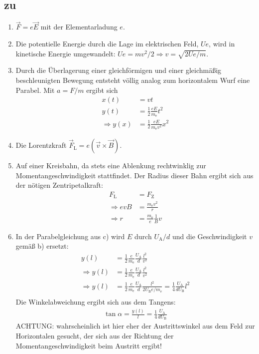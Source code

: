 \documentclass[a4paper]{scrartcl}
\begin{document}
\subsection{zu }
\label{lsg:ElektronEB}
\begin{enumerate}[noitemsep]
  \item $\vec F = e\vec E$ mit der Elementarladung $e$.
  \item Die potentielle Energie durch die Lage im elektrischen Feld, $Ue$, wird in kinetische Energie umgewandelt: $Ue = mv^2/2 \Rightarrow v = \sqrt{2Ue/m}$.
  \item Durch die Überlagerung einer gleichförmigen und einer gleichmäßig beschleunigten Bewegung entsteht völlig analog zum horizontalem Wurf eine Parabel. Mit $a = F/m$ ergibt sich
    \begin{align*}
      x(t) &= vt\\
      y(t) &= \frac{1}{2} \frac{eE}{m_\text{e}} t^2\\
      \Rightarrow y(x) & = \frac{1}{2} \frac{eE}{m_\text{e}v^2}x^2
    \end{align*}
  \item Die Lorentzkraft $\vec F_\text{L} = e(\vec v \times \vec B)$.
  \item Auf einer Kreisbahn, da stets eine Ablenkung rechtwinklig zur Momentangeschwindigkeit stattfindet. Der Radius dieser Bahn ergibt sich aus der nötigen Zentripetalkraft:
    \begin{align*}
      F_\text{L} &= F_\text{Z}\\
      \Rightarrow evB &= \frac{m_\text{e}v^2}{r}\\
      \Rightarrow r &= \frac{m_\text{e}}{e} \frac{1}{B} v
    \end{align*}
  \item In der Parabelgleichung aus c) wird $E$ durch $U_\text{A}/d$ und die Geschwindigkeit $v$ gemäß b) ersetzt:
    \begin{align*}
      y(l) &= \frac{1}{2}\frac{e}{m_\text{e}} \frac{U_\text{A}}{d} \frac{l^2}{v^2}\\
      \Rightarrow y(l) &= \frac{1}{2}\frac{e}{m_\text{e}} \frac{U_\text{A}}{d} \frac{l^2}{v^2}\\
      \Rightarrow y(l) &= \frac{1}{2}\frac{e}{m_\text{e}} \frac{U_\text{A}}{d} \frac{l^2}{{2U_\text{B}e}/{m_\text{e}}} = \frac{1}{4} \frac{U_\text{A}}{dU_\text{B}}l^2\\
    \end{align*}
    Die Winkelabweichung ergibt sich aus dem Tangens:
    \begin{align*}
      \tan \alpha = \frac{y(l)}{l} = \frac{1}{4}\frac{U_\text{A}}{dU_\text{B}}
    \end{align*}
    ACHTUNG: wahrscheinlich ist hier eher der Austrittswinkel aus dem Feld zur Horizontalen gesucht, der sich aus der Richtung der Momentangeschwindigkeit beim Austritt ergibt!


\end{enumerate}
\end{document}
